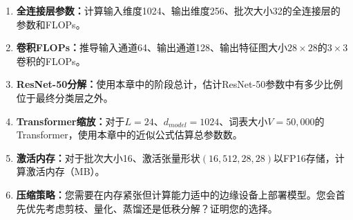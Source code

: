 \begin{enumerate}
    \item \textbf{全连接层参数：}计算输入维度1024、输出维度256、批次大小32的全连接层的参数和FLOPs。

    \item \textbf{卷积FLOPs：}推导输入通道64、输出通道128、输出特征图大小$28\times28$的$3\times3$卷积的FLOPs。

    \item \textbf{ResNet-50分解：}使用本章中的阶段总计，估计ResNet-50参数中有多少比例位于最终分类层之外。

    \item \textbf{Transformer缩放：}对于$L=24$、$d_{model}=1024$、词表大小$V=50{,}000$的Transformer，使用本章中的近似公式估算总参数数。

    \item \textbf{激活内存：}对于批次大小16、激活张量形状$(16, 512, 28, 28)$以FP16存储，计算激活内存（MB）。

    \item \textbf{压缩策略：}您需要在内存紧张但计算能力适中的边缘设备上部署模型。您会首先优先考虑剪枝、量化、蒸馏还是低秩分解？证明您的选择。
\end{enumerate}
